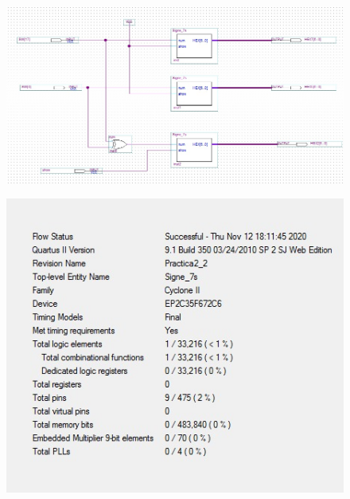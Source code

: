 \documentclass[12pt, a4papre]{article}
\begin{document}
\begin{figure}[H]
		\begin{center}
		\includegraphics[width=130mm]{signeextra.jpeg}
		\end{center}
	\end{figure}
	\begin{figure}[H]
		\begin{center}
		\includegraphics[width=130mm]{informeSigne.jpeg}
		\end{center}
	\end{figure}
\end{document}
